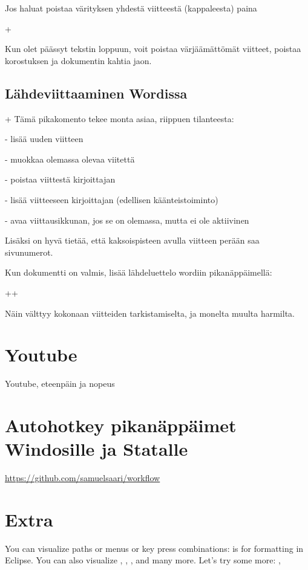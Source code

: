 \documentclass[a5paper,9pt]{scrartcl}
\begin{document}
    Jos haluat poistaa värityksen yhdestä viitteestä (kappaleesta) paina
    
     +
     
    Kun olet päässyt tekstin loppuun, voit poistaa värjäämättömät viitteet, poistaa korostuksen ja dokumentin kahtia jaon.
    
    \subsection{Lähdeviittaaminen Wordissa}
    
    +
    Tämä pikakomento tekee monta asiaa, riippuen tilanteesta:
    
    - lisää uuden viitteen
    
    - muokkaa olemassa olevaa viitettä
    
    - poistaa viittestä kirjoittajan
    
    - lisää viitteeseen kirjoittajan (edellisen käänteistoiminto)
    
    - avaa viittausikkunan, jos se on olemassa, mutta ei ole aktiivinen
    
    
    Lisäksi on hyvä tietää, että kaksoispisteen \keys{:} avulla viitteen perään saa sivunumerot.
    
    Kun dokumentti on valmis, lisää lähdeluettelo wordiin pikanäppäimellä:
    
    ++
    
    Näin välttyy kokonaan viitteiden tarkistamiselta, ja monelta muulta harmilta.
    
    \section{Youtube}
    Youtube, eteenpäin ja nopeus
    
    
    \section{Autohotkey pikanäppäimet Windosille ja Statalle}
    \url{https://github.com/samuelsaari/workflow}
    
    
    \section{Extra}
    You can visualize paths 
    or menus  or key
    press combinations:  is for formatting
    in Eclipse.
    You can also visualize \keys{\tab}, \keys{\capslock}, \keys{\Space}, 
    \keys{\arrowkeyup} and many more.
    Let's try some more: ,  
\end{document}
